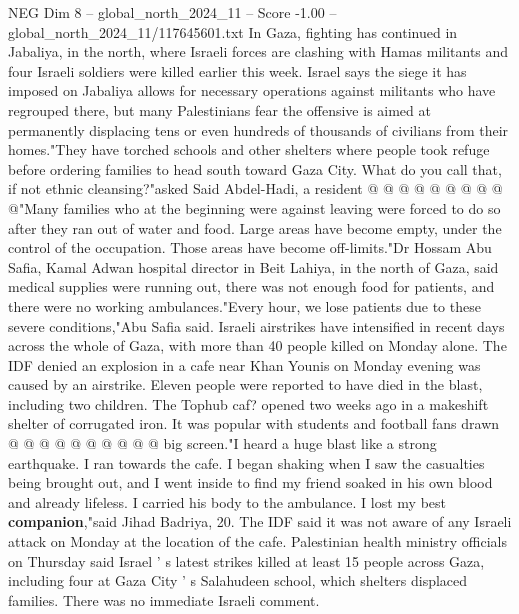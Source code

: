 \begin{textsample}{NEG Dim 8 – global\_north\_2024\_11 – Score -1.00 – global\_north\_2024\_11/117645601.txt}
In Gaza, fighting has continued in Jabaliya, in the north, where Israeli forces are clashing with Hamas militants and four Israeli soldiers were killed earlier this week.
Israel says the siege it has imposed on Jabaliya allows for necessary operations against militants who have regrouped there, but many Palestinians fear the offensive is aimed at permanently displacing tens or even hundreds of thousands of civilians from their homes."They have torched schools and other shelters where people took refuge before ordering families to head south toward Gaza City.
What do you call that, if not ethnic cleansing?"asked Said Abdel-Hadi, a resident @ @ @ @ @ @ @ @ @ @"Many families who at the beginning were against leaving were forced to do so after they ran out of water and food.
Large areas have become empty, under the control of the occupation.
Those areas have become off-limits."Dr Hossam Abu Safia, Kamal Adwan hospital director in Beit Lahiya, in the north of Gaza, said medical supplies were running out, there was not enough food for patients, and there were no working ambulances."Every hour, we lose patients due to these severe conditions,"Abu Safia said.
Israeli airstrikes have intensified in recent days across the whole of Gaza, with more than 40 people killed on Monday alone.
The IDF denied an explosion in a cafe near Khan Younis on Monday evening was caused by an airstrike.
Eleven people were reported to have died in the blast, including two children.
The Tophub caf? opened two weeks ago in a makeshift shelter of corrugated iron.
It was popular with students and football fans drawn @ @ @ @ @ @ @ @ @ @ big screen."I heard a huge blast like a strong earthquake.
I ran towards the cafe.
I began shaking when I saw the casualties being brought out, and I went inside to find my friend soaked in his own blood and already lifeless.
I carried his body to the ambulance.
I lost my best \textbf{companion},"said Jihad Badriya, 20.
The IDF said it was not aware of any Israeli attack on Monday at the location of the cafe.
Palestinian health ministry officials on Thursday said Israel ' s latest strikes killed at least 15 people across Gaza, including four at Gaza City ' s Salahudeen school, which shelters displaced families.
There was no immediate Israeli comment.

\end{textsample}
